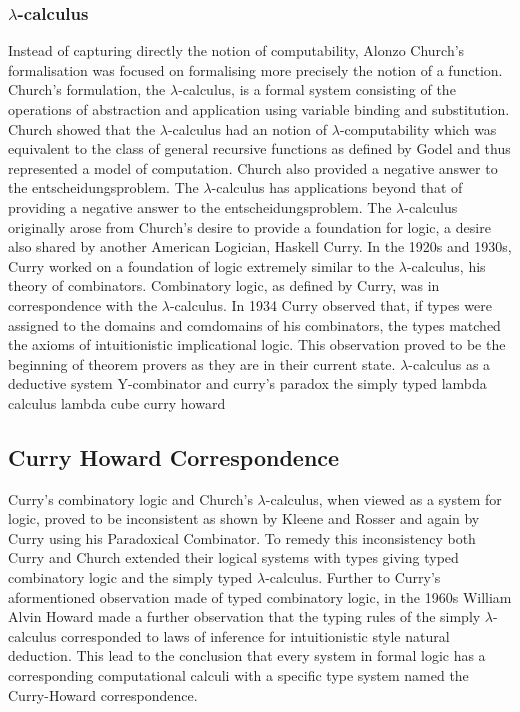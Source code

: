 \subsubsection{$\lambda$-calculus}
Instead of capturing directly the notion of computability, Alonzo Church's
formalisation was focused on formalising more precisely the notion of a function.
Church's formulation, the $\lambda$-calculus, is a formal system consisting of
the operations of abstraction and application using variable binding and
substitution. Church showed that the $\lambda$-calculus had an notion of
$\lambda$-computability which was equivalent to the class of general recursive
functions as defined by Godel and thus represented a model of computation.
Church also provided a negative answer to the entscheidungsproblem. The
$\lambda$-calculus has applications beyond that of providing a negative answer
to the entscheidungsproblem. The $\lambda$-calculus originally arose from Church's
desire to provide a foundation for logic, a desire also shared by another
American Logician, Haskell Curry. In the 1920s and 1930s, Curry worked on a
foundation of logic extremely similar to the $\lambda$-calculus, his theory of
combinators. Combinatory logic, as defined by Curry, was in correspondence with
the $\lambda$-calculus. In 1934 Curry observed that, if types were assigned to
the domains and comdomains of his combinators, the types  matched the axioms of
intuitionistic implicational logic. This observation proved to be the beginning
of theorem provers as they are in their current state.
$\lambda$-calculus as a deductive system
Y-combinator and curry's paradox
the simply typed lambda calculus
lambda cube
curry howard

\subsection{Curry Howard Correspondence}
Curry's combinatory logic and Church's $\lambda$-calculus, when viewed as a
system for logic, proved to be inconsistent as shown by Kleene and Rosser and
again by Curry using his Paradoxical Combinator. To remedy this inconsistency
both Curry and Church extended their logical systems with types giving typed
combinatory logic and the simply typed $\lambda$-calculus. Further to Curry's
aformentioned observation made of typed combinatory logic, in the 1960s William
Alvin Howard  made a further observation that the typing rules of the simply
$\lambda$-calculus corresponded to laws of inference for intuitionistic style
natural deduction. This lead to the conclusion that every system in
formal logic has a corresponding computational calculi with a specific type
system named the Curry-Howard correspondence.

